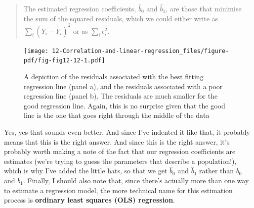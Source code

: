 \documentclass[
  a4paper,
]{book}
\begin{document}
\begin{quote}
The estimated regression coefficients, \(\hat{b}_0\) and \(\hat{b}_1\),
are those that minimise the sum of the squared residuals, which we could
either write as \(\sum_i (Y_i - \hat{Y}_i)^2\) or as
\(\sum_i \epsilon_i^2\).
\end{quote}

\begin{figure}[h!]

\texttt{[image: 12-Correlation-and-linear-regression\_files/figure-pdf/fig-fig12-12-1.pdf]} \hfill{}

\caption{\label{fig-fig12-12}A depiction of the residuals associated
with the best fitting regression line (panel a), and the residuals
associated with a poor regression line (panel b). The residuals are much
smaller for the good regression line. Again, this is no surprise given
that the good line is the one that goes right through the middle of the
data}

\end{figure}

Yes, yes that sounds even better. And since I've indented it like that,
it probably means that this is the right answer. And since this is the
right answer, it's probably worth making a note of the fact that our
regression coefficients are estimates (we're trying to guess the
parameters that describe a population!), which is why I've added the
little hats, so that we get \(\hat{b}_0\) and \(\hat{b}_1\) rather than
\(b_0\) and \(b_1\). Finally, I should also note that, since there's
actually more than one way to estimate a regression model, the more
technical name for this estimation process is \textbf{ordinary least
squares (OLS) regression}.
\end{document}
